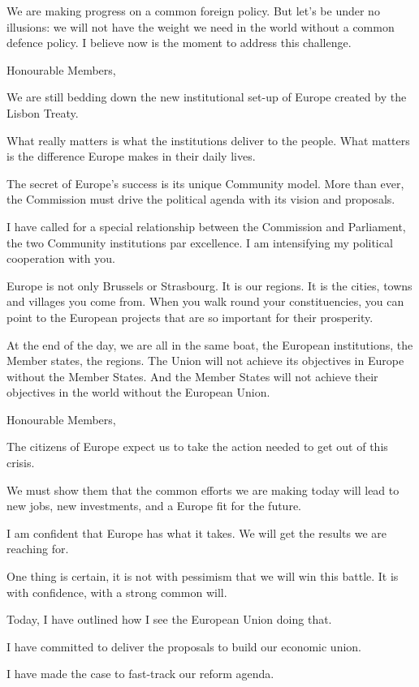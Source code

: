 \documentclass[a4paper,11pt]{article}
\begin{document}
We are making progress on a common foreign policy. But let's be under no illusions: we will not have the weight we need in the world without a common defence policy. I believe now is the moment to address this challenge.

Honourable Members,

We are still bedding down the new institutional set-up of Europe created by the Lisbon Treaty.

What really matters is what the institutions deliver to the people. What matters is the difference Europe makes in their daily lives.

The secret of Europe's success is its unique Community model. More than ever, the Commission must drive the political agenda with its vision and proposals.

I have called for a special relationship between the Commission and Parliament, the two Community institutions par excellence. I am intensifying my political cooperation with you.

Europe is not only Brussels or Strasbourg. It is our regions. It is the cities, towns and villages you come from. When you walk round your constituencies, you can point to the European projects that are so important for their prosperity.

At the end of the day, we are all in the same boat, the European institutions, the Member states, the regions. The Union will not achieve its objectives in Europe without the Member States. And the Member States will not achieve their objectives in the world without the European Union.

Honourable Members,

The citizens of Europe expect us to take the action needed to get out of this crisis.

We must show them that the common efforts we are making today will lead to new jobs, new investments, and a Europe fit for the future.

I am confident that Europe has what it takes. We will get the results we are reaching for.

One thing is certain, it is not with pessimism that we will win this battle. It is with confidence, with a strong common will.

Today, I have outlined how I see the European Union doing that.

I have committed to deliver the proposals to build our economic union.

I have made the case to fast-track our reform agenda.
\end{document}
